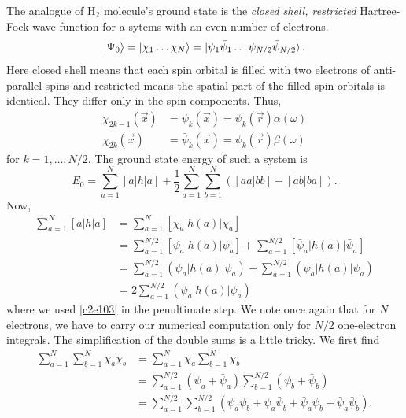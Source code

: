 The analogue of H$_2$ molecule's ground state is the \emph{closed shell,
restricted} Hartree-Fock wave function for a sytems with an even number of
electrons.
\begin{equation}\label{c2e108}
\ket{\Psi_0} = \ket{\chi_1\ldots\chi_N} = \ket{\psi_1\bar{\psi}_1\ldots\psi_{N/2}
\bar{\psi}_{N/2}}.
\end{equation}
Here closed shell means that each spin orbital is filled with two electrons
of anti-parallel spins and restricted means the spatial part of the filled spin
orbitals is identical. They differ only in the spin components. Thus,
\begin{equation}\label{c2e109}
\begin{aligned}
\chi_{2k-1}(\vec{x}) &= \psi_k(\vec{x}) = \psi_k(\vec{r})\alpha(\omega) \\
\chi_{2k}(\vec{x}) &= \bar{\psi}_k(\vec{x}) = \psi_k(\vec{r})\beta(\omega) 
\end{aligned}
\end{equation}
for $k = 1, \ldots, N/2$. The ground state energy of such a system is
\begin{equation}\label{c2e110}
E_0 = \sum_{a=1}^N[a|h|a] + \frac{1}{2}\sum_{a=1}^N\sum_{b=1}^N\left(
[aa|bb] - [ab|ba]\right).
\end{equation}
Now,
\begin{equation}\label{c2e111}
\begin{aligned}
\sum_{a=1}^N[a|h|a] &= \sum_{a=1}^N[\chi_a|h(a)|\chi_a] \\
 &= \sum_{a=1}^{N/2}[\psi_a|h(a)|\psi_a] + \sum_{a=1}^{N/2}[\bar{\psi}_a|h(a)|
 \bar{\psi}_a] \\
&= \sum_{a=1}^{N/2}(\psi_a|h(a)|\psi_a) + \sum_{a=1}^{N/2}(\psi_a|h(a)|\psi_a)\\
&= 2\sum_{a=1}^{N/2}(\psi_a|h(a)|\psi_a) 
\end{aligned}
\end{equation}
where we used \eqref{c2e103} in the penultimate step. We note once again that
for $N$ electrons, we have to carry our numerical computation only for $N/2$
one-electron integrals. The simplification of the double sums is a little tricky.
We first find
\begin{equation}\label{c1e112}
\begin{aligned}
\sum_{a=1}^N\sum_{b=1}^N\chi_a\chi_b &=\sum_{a=1}^N\chi_a\sum_{b=1}^N\chi_b\\
 &=\sum_{a=1}^{N/2}(\psi_a+\bar{\psi}_a)\sum_{b=1}^{N/2}(\psi_b+\bar{\psi}_b)\\
 &=\sum_{a=1}^{N/2}\sum_{b=1}^{N/2}(\psi_a\psi_b + \psi_a\bar{\psi}_b +
 \bar{\psi}_a\psi_b + \bar{\psi}_a\bar{\psi}_b).
\end{aligned}
\end{equation}
